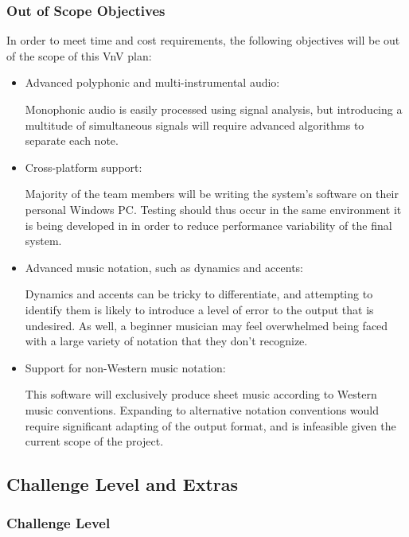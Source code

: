 \documentclass[12pt, titlepage]{article}
\begin{document}
\subsubsection{Out of Scope Objectives}
In order to meet time and cost requirements, the following objectives will be out of the scope of 
this VnV plan:
\begin{itemize}
  \item Advanced polyphonic and multi-instrumental audio:
  
  Monophonic audio is easily processed using signal analysis, but introducing a multitude of 
  simultaneous signals will require advanced algorithms to separate each note.
  
  \item Cross-platform support:
  
  Majority of the team members will be writing the system’s software on their personal Windows PC. 
  Testing should thus occur in the same environment it is being developed in in order to reduce 
  performance variability of the final system.
  
  \item Advanced music notation, such as dynamics and accents:
  
  Dynamics and accents can be tricky to differentiate, and attempting to identify them is likely to 
  introduce a level of error to the output that is undesired. As well, a beginner musician may feel 
  overwhelmed being faced with a large variety of notation that they don’t recognize.
  
  \item Support for non-Western music notation:
  
  This software will exclusively produce sheet music according to Western music conventions. Expanding 
  to alternative notation conventions would require significant adapting of the output format, and is 
  infeasible given the current scope of the project. 
  
\end{itemize}

\subsection{Challenge Level and Extras}

\subsubsection{Challenge Level}
\end{document}
